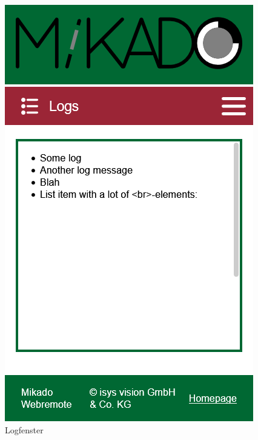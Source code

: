 \begin{figure}[H]
	\begin{center}
		\begin{minipage}{0.3\textwidth}
			\centering
			\includegraphics[width=\textwidth]{media/webremote-logs.png}
			\caption{Logfenster}
			\label{fig:webremote-logfenster}
		\end{minipage}
		\begin{minipage}{0.3\textwidth}
			\centering

\end{minipage}
\end{center}
\end{figure}
